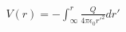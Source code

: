 \documentclass[preview]{standalone}
\begin{document}
\begin{align*}
V(r) = - \int_{\infty}^{r} \frac{Q}{4\pi \epsilon_0 r'^2} dr'
\end{align*}
\end{document}
